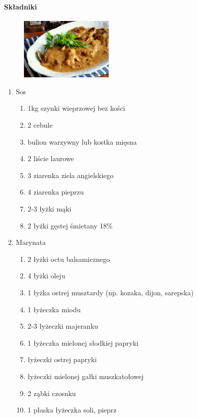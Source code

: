 \documentclass{article}
\begin{document}
    \paragraph{Składniki}
    \begin{figure}
        \includegraphics[width=0.4\textwidth]{szynka_w_sosie_wlasnym.jpg}
    \end{figure}
    \begin{enumerate}
    \item Sos
        \begin{enumerate}
            \item 1kg szynki wieprzowej bez kości
            \item 2 cebule
            \item bulion warzywny lub kostka mięsna
            \item 2 liście laurowe
            \item 3 ziarenka ziela angielskiego
            \item 4 ziarenka pieprzu
            \item 2-3 łyżki mąki
            \item 2 łyżki gęstej śmietany 18\%
        \end{enumerate}
     \item Marynata
        \begin{enumerate}
            \item 2 łyżki octu balsamicznego
            \item 4 łyżki oleju
            \item 1 łyżka ostrej musztardy (np. kozaka, dijon, sarepska)
            \item 1 łyżeczka miodu
            \item 2-3 łyżeczki majeranku
            \item 1 łyżeczka mielonej słodkiej papryki
            \item {} łyżeczki ostrej papryki
            \item {} łyżeczki mielonej gałki muszkatołowej
            \item 2 ząbki czosnku
            \item 1 płaska łyżeczka soli, pieprz
        \end{enumerate}
    \end{enumerate}
\end{document}
